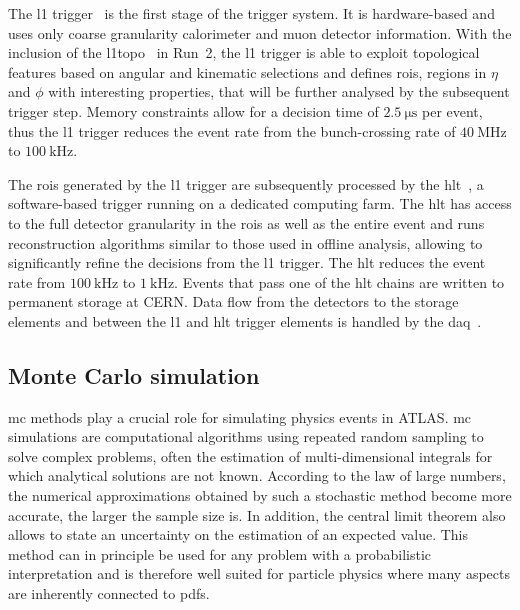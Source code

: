 The \gls{l1} trigger~\cite{CERN-LHCC-98-014} is the first stage of the trigger system. It is hardware-based and uses only coarse granularity calorimeter and muon detector information. With the inclusion of the \gls{l1topo}~\cite{Aad:2020wji} in Run~2, the \gls{l1} trigger is able to exploit topological features based on angular and kinematic selections and defines \glspl{roi}, \ie regions in $\eta$ and $\phi$ with interesting properties, that will be further analysed by the subsequent trigger step. Memory constraints allow for a decision time of $\SI{2.5}{\micro\second}$ per event, thus the \gls{l1} trigger reduces the event rate from the bunch-crossing rate of $\SI{40}{\MHz}$ to $\SI{100}{\kHz}$. 

The \glspl{roi} generated by the \gls{l1} trigger are subsequently processed by the \gls{hlt}~\cite{Jenni:616089}, a software-based trigger running on a dedicated computing farm. The \gls{hlt} has access to the full detector granularity in the \glspl{roi} as well as the entire event and runs reconstruction algorithms similar to those used in offline analysis, allowing to significantly refine the decisions from the \gls{l1} trigger. The \gls{hlt} reduces the event rate from $\SI{100}{\kHz}$ to $\SI{1}{\kHz}$. Events that pass one of the \gls{hlt} chains are written to permanent storage at CERN. Data flow from the detectors to the storage elements and between the \gls{l1} and \gls{hlt} trigger elements is handled by the \gls{daq}~\cite{Jenni:616089}.


\subsection{Monte Carlo simulation}\label{sec:mc_simulation}

\gls{mc} methods play a crucial role for simulating physics events in ATLAS. \gls{mc} simulations are computational algorithms using repeated random sampling to solve complex problems, often the estimation of multi-dimensional integrals for which analytical solutions are not known. According to the law of large numbers, the numerical approximations obtained by such a stochastic method become more accurate, the larger the sample size is. In addition, the central limit theorem also allows to state an uncertainty on the estimation of an expected value.  This method can in principle be used for any problem with a probabilistic interpretation and is therefore well suited for particle physics where many aspects are inherently connected to \glspl{pdf}. 

